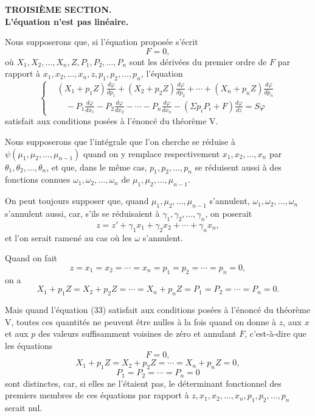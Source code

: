 \documentclass[11pt]{article}
\begin{document}
\begin{center}
{\bfseries TROISIÈME SECTION.}\\[0.8em]
{\bfseries L’équation n’est pas linéaire.}
\end{center}

Nous supposerons que, si l’équation proposée s’écrit
\[
F=0,
\]
où $X_1,X_2,\ldots,X_n,Z,P_1,P_2,\ldots,P_n$ sont les dérivées du premier ordre de $F$ par rapport à $x_1,x_2,\ldots,x_n,z,p_1,p_2,\ldots,p_n$, l’équation
\begin{equation*}\tag{33}
\left\{
\begin{aligned}
&(X_1+p_1Z)\frac{d\varphi}{dp_1}+(X_2+p_2Z)\frac{d\varphi}{dp_2}+\cdots+(X_n+p_nZ)\frac{d\varphi}{dp_n}\\
&\quad-P_1\frac{d\varphi}{dx_1}-P_2\frac{d\varphi}{dx_2}-\cdots-P_n\frac{d\varphi}{dx_n}-(\Sigma p_iP_i+F)\frac{d\varphi}{dz}=S\varphi
\end{aligned}
\right.
\end{equation*}
satisfait aux conditions posées à l’énoncé du théorème V.

Nous supposerons que l’intégrale que l’on cherche se réduise à $\psi(\mu_1,\mu_2,\ldots,\mu_{n-1})$ quand on y remplace respectivement $x_1,x_2,\ldots,x_n$ par $\theta_1,\theta_2,\ldots,\theta_n$, et que, dans le même cas, $p_1,p_2,\ldots,p_n$ se réduisent aussi à des fonctions connues $\omega_1,\omega_2,\ldots,\omega_n$ de $\mu_1,\mu_2,\ldots,\mu_{n-1}$.

On peut toujours supposer que, quand $\mu_1,\mu_2,\ldots,\mu_{n-1}$ s’annulent, $\omega_1,\omega_2,\ldots,\omega_n$ s’annulent aussi, car, s’ils se réduisaient à $\gamma_1,\gamma_2,\ldots,\gamma_n$, on poserait
\[
z=z'+\gamma_1x_1+\gamma_2x_2+\cdots+\gamma_nx_n,
\]
et l’on serait ramené au cas où les $\omega$ s’annulent.

Quand on fait
\[
z=x_1=x_2=\cdots=x_n=p_1=p_2=\cdots=p_n=0,
\]
on a
\[
X_1+p_1Z=X_2+p_2Z=\cdots=X_n+p_nZ=P_1=P_2=\cdots=P_n=0.
\]

Mais quand l’équation (33) satisfait aux conditions posées à l’énoncé du théorème V, toutes ces quantités ne peuvent être nulles à la fois quand on donne à $z$, aux $x$ et aux $p$ des valeurs suffisamment voisines de zéro et annulant $F$, c’est-à-dire que les équations
\[
F=0,
\]
\[
X_1+p_1Z=X_2+p_2Z=\cdots=X_n+p_nZ=0,
\]
\[
P_1=P_2=\cdots=P_n=0
\]
sont distinctes, car, si elles ne l’étaient pas, le déterminant fonctionnel des premiers membres de ces équations par rapport à $z,x_1,x_2,\ldots,x_n,p_1,p_2,\ldots,p_n$ serait nul.
\end{document}
